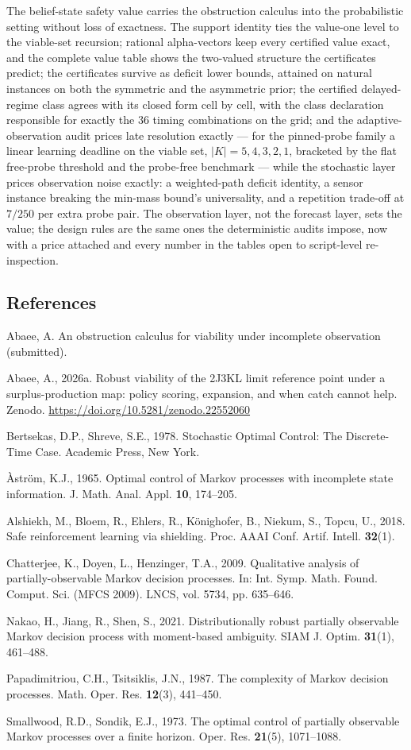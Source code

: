 \documentclass[10pt,twocolumn]{article}
\theoremstyle{plain}
\theoremstyle{definition}
\theoremstyle{remark}
\begin{document}
The belief-state safety value carries the obstruction calculus into the
probabilistic setting without loss of exactness. The support identity
ties the value-one level to the viable-set recursion; rational
alpha-vectors keep every certified value exact, and the complete value
table shows the two-valued structure the certificates predict; the
certificates survive as deficit lower bounds, attained on natural
instances on both the symmetric and the asymmetric prior; the certified
delayed-regime class agrees with its closed form cell by cell, with the class declaration responsible for exactly the 36 timing
combinations on the grid; and the adaptive-observation audit prices late resolution exactly ---
for the pinned-probe family a linear learning deadline on the viable
set, \(|K| = 5, 4, 3, 2, 1\), bracketed by the flat free-probe
threshold and the probe-free benchmark --- while the stochastic layer
prices observation noise exactly: a weighted-path deficit identity, a
sensor instance breaking the min-mass bound's universality, and a
repetition trade-off at \(7/250\) per extra probe pair. The
observation layer, not the forecast layer, sets the value; the design
rules are the same ones the deterministic audits impose, now with a
price attached and every number in the tables open to script-level
re-inspection.

\subsection*{References}

{\footnotesize
Abaee, A. An obstruction calculus for viability under incomplete
observation (submitted).

Abaee, A., 2026a. Robust viability of the 2J3KL limit reference point
under a surplus-production map: policy scoring, expansion, and when
catch cannot help. Zenodo.
\url{https://doi.org/10.5281/zenodo.22552060}

Bertsekas, D.P., Shreve, S.E., 1978. Stochastic Optimal Control: The
Discrete-Time Case. Academic Press, New York.

\`{A}str\"{o}m, K.J., 1965. Optimal control of Markov processes with
incomplete state information. J. Math. Anal. Appl. \textbf{10},
174--205.

Alshiekh, M., Bloem, R., Ehlers, R., K\"{o}nighofer, B., Niekum, S.,
Topcu, U., 2018. Safe reinforcement learning via shielding. Proc. AAAI
Conf. Artif. Intell. \textbf{32}(1).

Chatterjee, K., Doyen, L., Henzinger, T.A., 2009. Qualitative analysis
of partially-observable Markov decision processes. In: Int. Symp. Math.
Found. Comput. Sci. (MFCS 2009). LNCS, vol. 5734, pp. 635--646.

Nakao, H., Jiang, R., Shen, S., 2021. Distributionally robust partially
observable Markov decision process with moment-based ambiguity. SIAM J.
Optim. \textbf{31}(1), 461--488.

Papadimitriou, C.H., Tsitsiklis, J.N., 1987. The complexity of Markov
decision processes. Math. Oper. Res. \textbf{12}(3), 441--450.

Smallwood, R.D., Sondik, E.J., 1973. The optimal control of partially
observable Markov processes over a finite horizon. Oper. Res.
\textbf{21}(5), 1071--1088.
}
\end{document}
